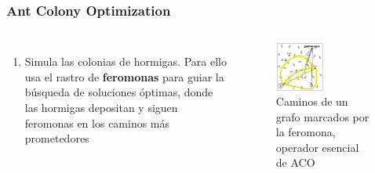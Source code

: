 \begin{frame}
  \frametitle{Ant Colony Optimization}
  \begin{columns}
    \begin{enumerate}
      \item Simula las colonias de hormigas. Para ello usa el rastro de \textbf{feromonas} para guiar la búsqueda de soluciones óptimas, donde las hormigas depositan y siguen feromonas en los caminos más prometedores
    \end{enumerate}
    \begin{figure}
      \begin{center}
        \includegraphics[width=0.5\textwidth]{imagenes/chapter3/aco.png}
      \end{center}
      \caption{Caminos de un grafo marcados por la feromona, operador esencial de ACO}
    \end{figure}
  \end{columns}
\end{frame}

